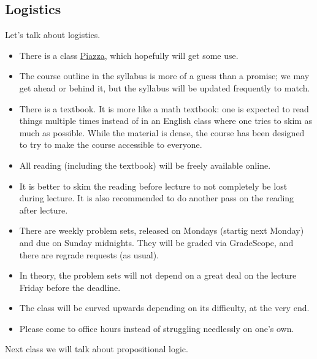 \subsection{Logistics}
Let's talk about logistics.
\begin{itemize}
	\item There is a class \href{https://piazza.com/class/ky91rs7rzr02bc}{Piazza}, which hopefully will get some use.
	\item The course outline in the syllabus is more of a guess than a promise; we may get ahead or behind it, but the syllabus will be updated frequently to match.
	\item There is a textbook. It is more like a math textbook: one is expected to read things multiple times instead of in an English class where one tries to skim as much as possible. While the material is dense, the course has been designed to try to make the course accessible to everyone.
	\item All reading (including the textbook) will be freely available online.
	\item It is better to skim the reading before lecture to not completely be lost during lecture. It is also recommended to do another pass on the reading after lecture.
	\item There are weekly problem sets, released on Mondays (startig next Monday) and due on Sunday midnights. They will be graded via GradeScope, and there are regrade requests (as usual).
	\item In theory, the problem sets will not depend on a great deal on the lecture Friday before the deadline.
	\item The class will be curved upwards depending on its difficulty, at the very end.
	\item Please come to office hours instead of struggling needlessly on one's own.
\end{itemize}
Next class we will talk about propositional logic.